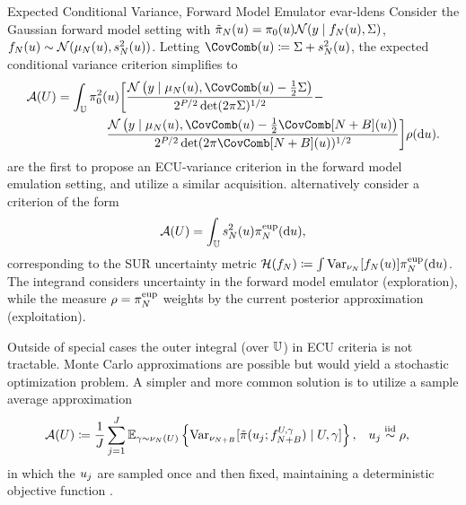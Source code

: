 \documentclass[12pt]{article}
\begin{document}
\begin{examplebox}
{Expected Conditional Variance, Forward Model Emulator}
{evar-ldens}
Consider the Gaussian forward model setting with 
$\postEm(\Par) = \priorDens(\Par) \Gaussian(\obs \given \targetEm(\Par), \likPar)$, 
$\targetEm(\Par) \sim \Gaussian(\emMean(\Par), \emVar(\Par))$. Letting 
$\CovComb(\Par) \Def \likPar + \emVar(\Par)$, the expected conditional variance criterion
simplifies to
\begin{align}
\acq(\ParBatch) &= 
\int_{\parSpace} \priorDens^2(\Par) \bigg[\frac{\Gaussian\left(\obs \given \emMean(\Par), \CovComb(\Par) - \frac{1}{2}\likPar \right)}{2^{\dimObs/2} \det(2\pi \likPar)^{1/2}} - \label{eq:acq-int-var-fwd} \\
&\qquad\qquad \frac{\Gaussian\left(\obs \given \emMean(\Par), \CovComb(\Par) - \frac{1}{2}\CovComb[\Naugment](\Par) \right)}{2^{\dimObs/2} \det(2\pi \CovComb[\Naugment](\Par))^{1/2}} \bigg] \weightdens(\d\Par). \nonumber
\end{align}
\citet{SinsbeckNowak} are the first to propose an ECU-variance criterion in the forward model emulation setting,
and \citet{Surer2023sequential} utilize a similar acquisition. \citet{weightedIVAR} alternatively consider a criterion of the form
\begin{equation}
\acq(\ParBatch) = \int_{\parSpace} \emVar(\Par) \postApproxEUPNorm(\d\Par),
\label{eq:weighted-ivar}
\end{equation}
corresponding to the SUR uncertainty metric 
$\surmetric(\targetEm) \Def \int \Var_{\emDist}[\targetEm(\Par)] \postApproxEUPNorm(\d\Par)$. 
The integrand considers uncertainty
in the forward model emulator (exploration), while the measure $\weightdens = \postApproxEUPNorm$ 
weights by the current posterior approximation (exploitation).  
\end{examplebox}

Outside of special cases \citep{Binois_2018,MakTargetedVar,Koermer2024} the outer 
integral (over $\parSpace$) in ECU criteria is not tractable. Monte Carlo approximations
are possible but would yield a stochastic optimization problem. A simpler and more common solution is 
to utilize a sample average approximation
\begin{align}
&\acq(\ParBatch) \Def \frac{1}{J}
\sum_{j=1}^{J} 
\E_{\gamma \sim \emDist(\ParBatch)} 
\left\{\Var_{\emDist[\Naugment]}[\postDens(\Par_j; \targetEm[\Naugment]^{\ParBatch,\gamma}) \given \ParBatch, \gamma]\right\},
&&\Par_j \overset{\mathrm{iid}}{\sim} \weightdens,
 \label{eq:acq-intvar-saa}
\end{align}
in which the $\Par_j$ are sampled once and then fixed, maintaining a deterministic 
objective function \citep{Mercer_kernels_IVAR,botorch}.
\end{document}
